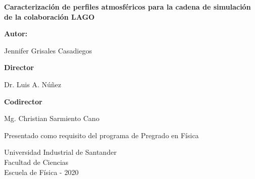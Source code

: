 \documentclass[a4paper,12pt,twoside]{report}
\title{}
\begin{document}
\begin{center}
\thispagestyle{empty}
\fontsize{12pt}{12pt}\selectfont 



\textbf {\huge Caracterización de perfiles atmosféricos para la cadena de simulación de la colaboración LAGO}

\vspace{3cm}


{\large \textbf{Autor:}}

\vspace{0.5cm}

\large Jennifer Grisales Casadiegos

\vspace{3cm}

{\large \textbf{Director}}\\

\vspace{0.5cm}

{\large Dr. Luis A. Núñez}\\

\vspace{0.5cm}

{\large \textbf{Codirector}}\\

\vspace{0.5cm}

{\large Mg. Christian Sarmiento Cano}

\vspace{3cm}

\normalsize

\large Presentado como requisito del programa de 
\linebreak
\large Pregrado en Física

\vspace{4cm}



\large Universidad Industrial de Santander\\
\large  Facultad de Ciencias \\
\large  Escuela de Física - 2020
  \end{center}
\large
\newpage

\newpage


\setcounter{page}{2}


\end{document}
